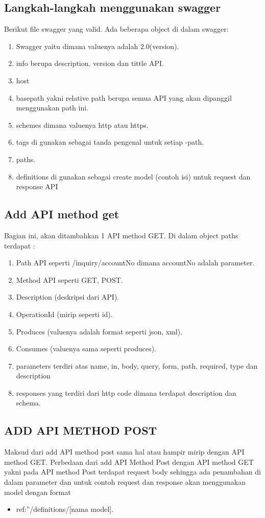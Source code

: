 \documentclass[12pt,a4paper]{article}
\begin{document}
\subsection{Langkah-langkah menggunakan swagger } 
Berikut file swagger yang valid. Ada beberapa object di dalam swagger:
\begin{enumerate}
\item Swagger yaitu dimana valuenya adalah 2.0(version).
\item info berupa description, version dan tittle API.
\item host
\item basepath yakni relative path berupa semua API yang akan dipanggil menggunakan path ini.
\item schemes dimana valuenya http atau https.
\item tags di gunakan sebagai tanda pengenal untuk setiap -path.
\item paths.
\item definitions di gunakan sebagai create model (contoh isi) untuk request dan response API
\end{enumerate}

\subsection{Add API method get}
Bagian ini, akan ditambahkan 1 API method GET. Di dalam object paths terdapat :
\begin{enumerate}
\item Path API seperti /inquiry/{accountNo} dimana accountNo adalah parameter.
\item Method API seperti GET, POST.
\item Description (deskripsi dari API).
\item OperationId (mirip seperti id).
\item Produces (valuenya adalah format seperti json, xml).
\item Consumes (valuenya sama seperti produces).
\item parameters terdiri atas name, in, body, query, form, path, required, type dan description
\item responses yang terdiri dari http code dimana terdapat description dan schema.
\end{enumerate}
\subsection{ADD API METHOD POST}
Maksud dari add API method post sama hal atau hampir mirip dengan  API method GET. Perbedaan dari add API Method Post dengan API method GET yakni pada API method Post terdapat request body sehingga ada penambahan di dalam parameter dan untuk contoh request dan response akan menggunakan model dengan format 
\begin{itemize}
\item ref:”/definitions/[nama model].
\end{itemize}
\end{document}
